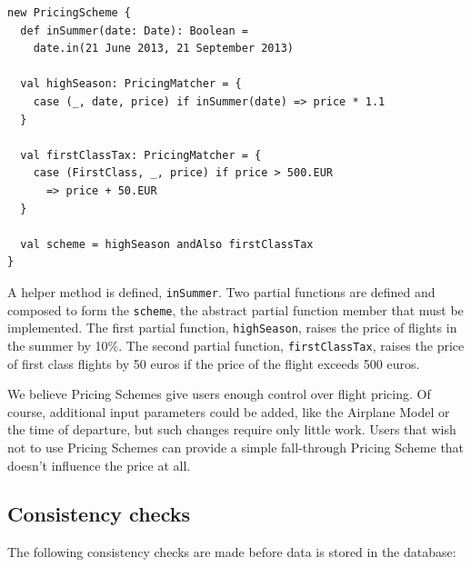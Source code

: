 \documentclass[a4paper]{article}
\renewcommand{\sc}[1]{\lstinline{#1}}
\begin{document}
\begin{lstlisting}
new PricingScheme {
  def inSummer(date: Date): Boolean =
    date.in(21 June 2013, 21 September 2013)

  val highSeason: PricingMatcher = {
    case (_, date, price) if inSummer(date) => price * 1.1
  }

  val firstClassTax: PricingMatcher = {
    case (FirstClass, _, price) if price > 500.EUR
      => price + 50.EUR
  }

  val scheme = highSeason andAlso firstClassTax
}
\end{lstlisting}

A helper method is defined, \sc{inSummer}.
Two partial functions are defined and composed to form the \sc{scheme}, the abstract partial function member that must be implemented.
The first partial function, \sc{highSeason}, raises the price of flights in the summer by 10\%.
The second partial function, \sc{firstClassTax}, raises the price of first class flights by 50 euros if the price of the flight exceeds 500 euros.

We believe Pricing Schemes give users enough control over flight pricing.
Of course, additional input parameters could be added, like the Airplane Model or the time of departure, but such changes require only little work.
Users that wish not to use Pricing Schemes can provide a simple fall-through Pricing Scheme that doesn't influence the price at all.

\subsection{Consistency checks}
\label{sec:consistency-checks}
The following consistency checks are made before data is stored in the database:
\end{document}
